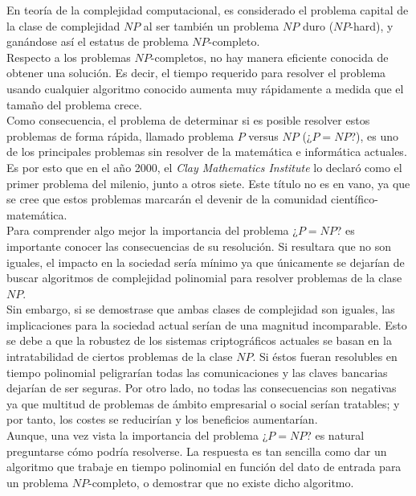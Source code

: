 En teoría de la complejidad computacional, es considerado el problema capital de la clase de complejidad $NP$ al ser también un problema $NP$ duro ($NP$-hard), y ganándose así el estatus de problema $NP$-completo. \\

Respecto a los problemas $NP$-completos, no hay manera eficiente conocida de obtener una solución. Es decir, el tiempo requerido para resolver el problema usando cualquier algoritmo conocido aumenta muy rápidamente a medida que el tamaño del problema crece.\\

Como consecuencia, el problema de determinar si es posible resolver estos problemas de forma rápida, llamado problema $P$ versus $NP$ (¿$P=NP$?), es uno de los principales problemas sin resolver de la matemática e informática actuales. Es por esto que en el año 2000, el \textit{Clay Mathematics Institute} lo declaró como el primer problema del milenio, junto a otros siete. Este título no es en vano, ya que se cree que estos problemas marcarán el devenir de la comunidad científico-matemática.\\

Para comprender algo mejor la importancia del problema ¿$P=NP$? es importante conocer las consecuencias de su resolución. Si resultara que no son iguales, el impacto en la sociedad sería mínimo ya que únicamente se dejarían de buscar algoritmos de complejidad polinomial para resolver problemas de la clase $NP$.\\

Sin embargo, si se demostrase que ambas clases de complejidad son iguales, las implicaciones para la sociedad actual serían de una magnitud incomparable. Esto se debe a que la robustez de los sistemas criptográficos actuales se basan en la intratabilidad de ciertos problemas de la clase $NP$. Si éstos fueran resolubles en tiempo polinomial peligrarían todas las comunicaciones y las claves bancarias dejarían de ser seguras. Por otro lado, no todas las consecuencias son negativas ya que multitud de problemas de ámbito empresarial o social serían tratables; y por tanto, los costes se reducirían y los beneficios aumentarían.\\

Aunque, una vez vista la importancia del problema ¿$P=NP$? es natural preguntarse cómo podría resolverse. La respuesta es tan sencilla como dar un algoritmo que trabaje en tiempo polinomial en función del dato de entrada para un problema $NP$-completo, o demostrar que no existe dicho algoritmo. \\ 

